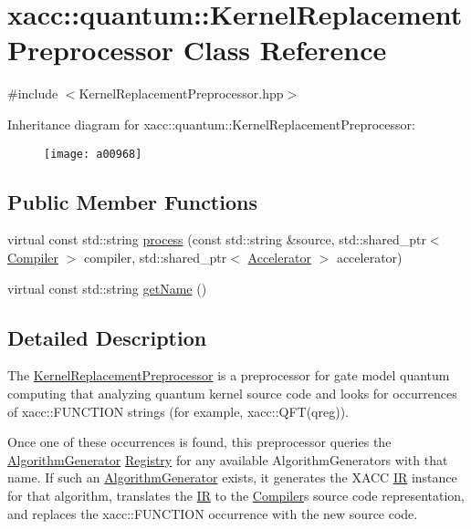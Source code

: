 \hypertarget{a00968}{}\section{xacc\+:\+:quantum\+:\+:Kernel\+Replacement\+Preprocessor Class Reference}
\label{a00968}


{\ttfamily \#include $<$Kernel\+Replacement\+Preprocessor.\+hpp$>$}

Inheritance diagram for xacc\+:\+:quantum\+:\+:Kernel\+Replacement\+Preprocessor\+:\begin{figure}[H]
\begin{center}
\leavevmode
\texttt{[image: a00968]}
\end{center}
\end{figure}
\subsection*{Public Member Functions}
\begin{DoxyCompactItemize}
\item 
virtual const std\+::string \hyperlink{a00968_ad4f9ba1f83ea45ed376f36e3853c668d}{process} (const std\+::string \&source, std\+::shared\+\_\+ptr$<$ \hyperlink{a01100}{Compiler} $>$ compiler, std\+::shared\+\_\+ptr$<$ \hyperlink{a01084}{Accelerator} $>$ accelerator)
\item 
virtual const std\+::string \hyperlink{a00968_af74db6b7f3adeb7d203777f5ce450491}{get\+Name} ()
\end{DoxyCompactItemize}


\subsection{Detailed Description}
The \hyperlink{a00968}{Kernel\+Replacement\+Preprocessor} is a preprocessor for gate model quantum computing that analyzing quantum kernel source code and looks for occurrences of \textquotesingle{}xacc\+::\+F\+U\+N\+C\+T\+I\+ON\textquotesingle{} strings (for example, xacc\+::\+Q\+F\+T(qreg)).

Once one of these occurrences is found, this preprocessor queries the \hyperlink{a01116}{Algorithm\+Generator} \hyperlink{a01196}{Registry} for any available Algorithm\+Generators with that name. If such an \hyperlink{a01116}{Algorithm\+Generator} exists, it generates the X\+A\+CC \hyperlink{a01148}{IR} instance for that algorithm, translates the \hyperlink{a01148}{IR} to the \hyperlink{a01100}{Compiler}\textquotesingle{}s source code representation, and replaces the \textquotesingle{}xacc\+::\+F\+U\+N\+C\+T\+I\+ON\textquotesingle{} occurrence with the new source code. 

